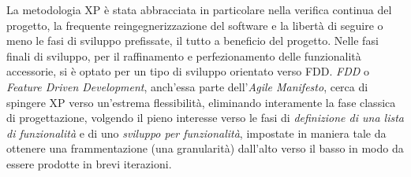 La metodologia XP è stata abbracciata in particolare nella verifica continua del progetto, la frequente reingegnerizzazione del software e la libertà di seguire o meno le fasi di sviluppo prefissate, il tutto a beneficio del progetto. Nelle fasi finali di sviluppo, per il raffinamento e perfezionamento delle funzionalità accessorie, si è optato per un tipo di sviluppo orientato verso FDD.
\textit{FDD} o \textit{Feature Driven Development}, anch'essa parte dell'\textit{Agile Manifesto}, cerca di spingere XP verso un'estrema flessibilità, eliminando interamente la fase classica di progettazione, volgendo il pieno interesse verso le fasi di \textit{definizione di una lista di funzionalità} e di uno \textit{sviluppo per funzionalità}, impostate in maniera tale da ottenere una frammentazione (una granularità) dall'alto verso il basso in modo da essere prodotte in brevi iterazioni.
